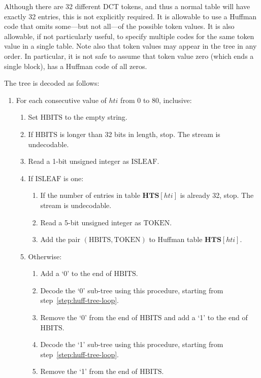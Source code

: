 \documentclass[9pt,letterpaper]{book}
\newcommand{\idx}[1]{{\ensuremath{\mathit{#1}}}}
\newcommand{\hti}{\idx{hti}}
\newcommand{\bitvar}[1]{\ensuremath{\mathbf{\bm{#1}}}}
\newcommand{\locvar}[1]{\ensuremath{\mathrm{#1}}}
\numberwithin{equation}{chapter}
\numberwithin{figure}{chapter}
\numberwithin{table}{chapter}
\begin{document}
Although there are 32 different DCT tokens, and thus a normal table will have
 exactly 32 entries, this is not explicitly required.
It is allowable to use a Huffman code that omits some---but not all---of the
 possible token values.
It is also allowable, if not particularly useful, to specify multiple codes for
 the same token value in a single table.
Note also that token values may appear in the tree in any order.
In particular, it is not safe to assume that token value zero (which ends a
 single block), has a Huffman code of all zeros.

The tree is decoded as follows:

\begin{enumerate}
\item
For each consecutive value of \locvar{\hti} from $0$ to $80$, inclusive:
\begin{enumerate}
\item
Set \locvar{HBITS} to the empty string.
\item
\label{step:huff-tree-loop}
If \locvar{HBITS} is longer than 32 bits in length, stop.
The stream is undecodable.
\item
Read a 1-bit unsigned integer as \locvar{ISLEAF}.
\item
If \locvar{ISLEAF} is one:
\begin{enumerate}
\item
If the number of entries in table $\bitvar{HTS}[\locvar{\hti}]$ is already 32,
 stop.
The stream is undecodable.
\item
Read a 5-bit unsigned integer as \locvar{TOKEN}.
\item
Add the pair $(\locvar{HBITS},\locvar{TOKEN})$ to Huffman table
 $\bitvar{HTS}[\locvar{\hti}]$.
\end{enumerate}
\item
Otherwise:
\begin{enumerate}
\item
Add a `0' to the end of \locvar{HBITS}.
\item
Decode the `0' sub-tree using this procedure, starting from
 step~\ref{step:huff-tree-loop}.
\item
Remove the `0' from the end of \locvar{HBITS} and add a `1' to the end of
 \locvar{HBITS}.
\item
Decode the `1' sub-tree using this procedure, starting from
 step~\ref{step:huff-tree-loop}.
\item
Remove the `1' from the end of \locvar{HBITS}.
\end{enumerate}
\end{enumerate}
\end{enumerate}
\end{document}
